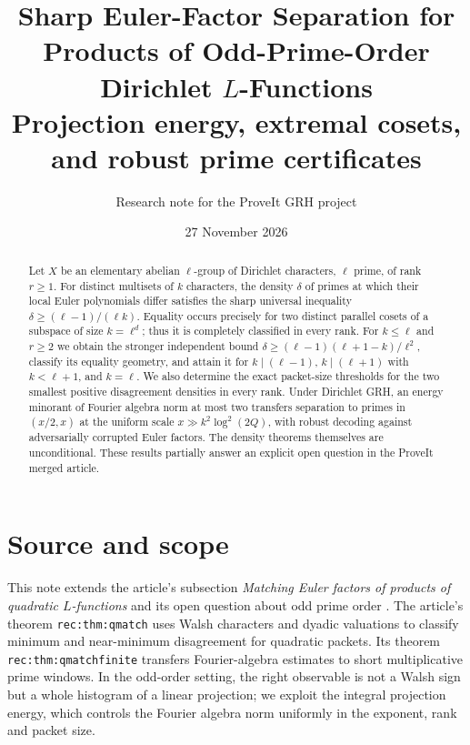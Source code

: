 \documentclass[11pt]{article}
\title{\textbf{Sharp Euler-Factor Separation for Products of Odd-Prime-Order Dirichlet $L$-Functions}\\[4pt]\large Projection energy, extremal cosets, and robust prime certificates}
\author{Research note for the ProveIt GRH project}
\date{27 November 2026}
\theoremstyle{remark}\newtheorem{remark}[theorem]{Remark}
\newcommand{\1}{\mathbf 1}
\begin{document}
\maketitle
\begin{abstract}
Let $X$ be an elementary abelian $\ell$-group of Dirichlet characters, $\ell$ prime, of rank $r\ge1$. For distinct multisets of $k$ characters, the density $\delta$ of primes at which their local Euler polynomials differ satisfies the sharp universal inequality $\delta\ge(\ell-1)/(\ell k)$. Equality occurs precisely for two distinct parallel cosets of a subspace of size $k=\ell^d$; thus it is completely classified in every rank. For $k\le\ell$ and $r\ge2$ we obtain the stronger independent bound $\delta\ge(\ell-1)(\ell+1-k)/\ell^2$, classify its equality geometry, and attain it for $k\mid(\ell-1)$, $k\mid(\ell+1)$ with $k<\ell+1$, and $k=\ell$. We also determine the exact packet-size thresholds for the two smallest positive disagreement densities in every rank. Under Dirichlet GRH, an energy minorant of Fourier algebra norm at most two transfers separation to primes in $(x/2,x)$ at the uniform scale $x\gg k^2\log^2(2Q)$, with robust decoding against adversarially corrupted Euler factors. The density theorems themselves are unconditional. These results partially answer an explicit open question in the ProveIt merged article.
\end{abstract}
\section{Source and scope}
This note extends the article's subsection \emph{Matching Euler factors of products of quadratic $L$-functions} and its open question about odd prime order \cite{article}. The article's theorem \texttt{rec:thm:qmatch} uses Walsh characters and dyadic valuations to classify minimum and near-minimum disagreement for quadratic packets. Its theorem \texttt{rec:thm:qmatchfinite} transfers Fourier-algebra estimates to short multiplicative prime windows. In the odd-order setting, the right observable is not a Walsh sign but a whole histogram of a linear projection; we exploit the integral projection energy, which controls the Fourier algebra norm uniformly in the exponent, rank and packet size.
\end{document}
